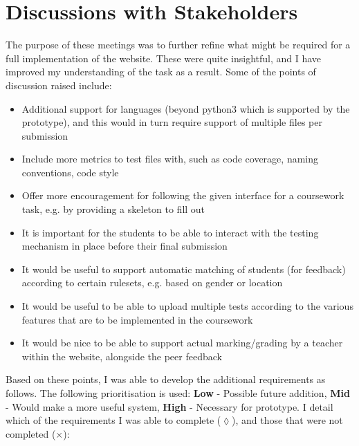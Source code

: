 \documentclass[a4paper,11pt]{report}
\begin{document}
\section{Discussions with Stakeholders}
The purpose of these meetings was to further refine what might be required for a full implementation of the website. These were quite insightful, and I have improved my understanding of the task as a result. Some of the points of discussion raised include:
\begin{itemize}
\item Additional support for languages (beyond python3 which is supported by the prototype), and this would in turn require support of multiple files per submission
\item Include more metrics to test files with, such as code coverage, naming conventions, code style
\item Offer more encouragement for following the given interface for a coursework task, e.g. by providing a skeleton to fill out
\item It is important for the students to be able to interact with the testing mechanism in place before their final submission
\item It would be useful to support automatic matching of students (for feedback) according to certain rulesets, e.g. based on gender or location
\item It would be useful to be able to upload multiple tests according to the various features that are to be implemented in the coursework
\item It would be nice to be able to support actual marking/grading by a teacher within the website, alongside the peer feedback
\end{itemize}
Based on these points, I was able to develop the additional requirements as follows. The following prioritisation is used: \textbf{Low} - Possible future addition, \textbf{Mid} - Would make a more useful system, \textbf{High} - Necessary for prototype. I detail which of the requirements I was able to complete ($\lozenge$), and those that were not completed ($\times$):
\end{document}
